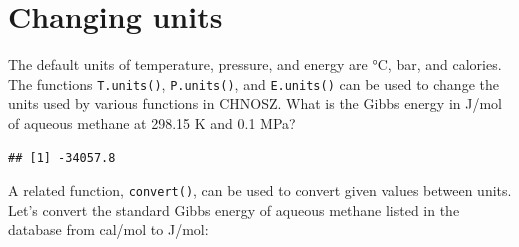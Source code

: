 \documentclass[]{tufte-book}
\newenvironment{Shaded}{}{}
\newcommand{\KeywordTok}[1]{\textcolor[rgb]{0.00,0.44,0.13}{\textbf{#1}}}
\newcommand{\DataTypeTok}[1]{\textcolor[rgb]{0.56,0.13,0.00}{#1}}
\newcommand{\DecValTok}[1]{\textcolor[rgb]{0.25,0.63,0.44}{#1}}
\newcommand{\FloatTok}[1]{\textcolor[rgb]{0.25,0.63,0.44}{#1}}
\newcommand{\StringTok}[1]{\textcolor[rgb]{0.25,0.44,0.63}{#1}}
\newcommand{\OtherTok}[1]{\textcolor[rgb]{0.00,0.44,0.13}{#1}}
\newcommand{\OperatorTok}[1]{\textcolor[rgb]{0.40,0.40,0.40}{#1}}
\newcommand{\NormalTok}[1]{#1}
\begin{document}
\begin{Shaded}
\end{Shaded}

\section{Changing units}\label{changing-units}

The default units of temperature, pressure, and energy are °C, bar, and
calories. The functions {\texttt{T.units()}}, {\texttt{P.units()}}, and
{\texttt{E.units()}} can be used to change the units used by various
functions in CHNOSZ. What is the Gibbs energy in J/mol of aqueous
methane at 298.15 K and 0.1 MPa?

\begin{Shaded}
\end{Shaded}

\begin{verbatim}
## [1] -34057.8
\end{verbatim}

A related function, {\texttt{convert()}}, can be used to convert given
values between units. Let's convert the standard Gibbs energy of aqueous
methane listed in the database from cal/mol to J/mol:
\end{document}
